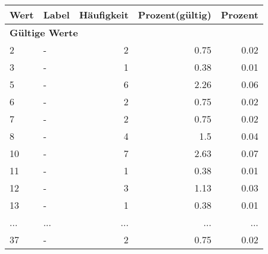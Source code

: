      \begin{longtable}{lXrrr}
     \toprule
     \textbf{Wert} & \textbf{Label} & \textbf{Häufigkeit} & \textbf{Prozent(gültig)} & \textbf{Prozent} \\
     \endhead
     \midrule
     \multicolumn{5}{l}{\textbf{Gültige Werte}}\\
        2 & \multicolumn{1}{X}{-} & %
          \num{2} &
          \num[round-mode=places,round-precision=2]{0,75} &
          \num[round-mode=places,round-precision=2]{0,02} \\
        3 & \multicolumn{1}{X}{-} & %
          \num{1} &
          \num[round-mode=places,round-precision=2]{0,38} &
          \num[round-mode=places,round-precision=2]{0,01} \\
        5 & \multicolumn{1}{X}{-} & %
          \num{6} &
          \num[round-mode=places,round-precision=2]{2,26} &
          \num[round-mode=places,round-precision=2]{0,06} \\
        6 & \multicolumn{1}{X}{-} & %
          \num{2} &
          \num[round-mode=places,round-precision=2]{0,75} &
          \num[round-mode=places,round-precision=2]{0,02} \\
        7 & \multicolumn{1}{X}{-} & %
          \num{2} &
          \num[round-mode=places,round-precision=2]{0,75} &
          \num[round-mode=places,round-precision=2]{0,02} \\
        8 & \multicolumn{1}{X}{-} & %
          \num{4} &
          \num[round-mode=places,round-precision=2]{1,5} &
          \num[round-mode=places,round-precision=2]{0,04} \\
        10 & \multicolumn{1}{X}{-} & %
          \num{7} &
          \num[round-mode=places,round-precision=2]{2,63} &
          \num[round-mode=places,round-precision=2]{0,07} \\
        11 & \multicolumn{1}{X}{-} & %
          \num{1} &
          \num[round-mode=places,round-precision=2]{0,38} &
          \num[round-mode=places,round-precision=2]{0,01} \\
        12 & \multicolumn{1}{X}{-} & %
          \num{3} &
          \num[round-mode=places,round-precision=2]{1,13} &
          \num[round-mode=places,round-precision=2]{0,03} \\
        13 & \multicolumn{1}{X}{-} & %
          \num{1} &
          \num[round-mode=places,round-precision=2]{0,38} &
          \num[round-mode=places,round-precision=2]{0,01} \\
       ... & ... & ... & ... & ... \\
        37 & \multicolumn{1}{X}{-} & %
          \num{2} &
          \num[round-mode=places,round-precision=2]{0,75} &
          \num[round-mode=places,round-precision=2]{0,02} \\


\end{longtable}
